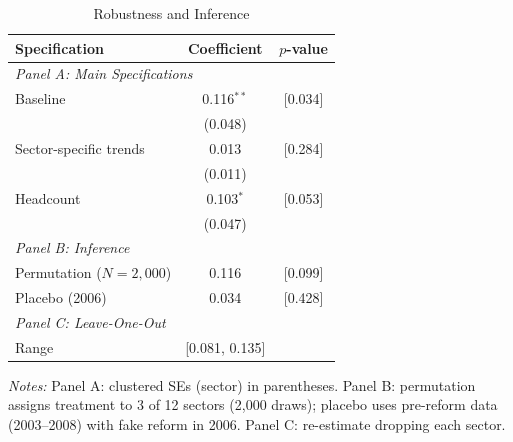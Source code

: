 \begin{table}[htbp]
\centering
\caption{Robustness and Inference}
\label{tab:robustness}
\begin{threeparttable}
\begin{tabular}{lcc}
\toprule
Specification & Coefficient & $p$-value \\
\midrule
\multicolumn{3}{l}{\textit{Panel A: Main Specifications}} \\
Baseline & 0.116$^{**}$ & [0.034] \\
 & (0.048) & \\
Sector-specific trends & 0.013 & [0.284] \\
 & (0.011) & \\
Headcount & 0.103$^{*}$ & [0.053] \\
 & (0.047) & \\
\midrule
\multicolumn{3}{l}{\textit{Panel B: Inference}} \\
Permutation ($N=2{,}000$) & 0.116 & [0.099] \\
Placebo (2006) & 0.034 & [0.428] \\
\midrule
\multicolumn{3}{l}{\textit{Panel C: Leave-One-Out}} \\
Range & [0.081, 0.135] & \\
\bottomrule
\end{tabular}
\begin{tablenotes}[flushleft]\small
\item \textit{Notes:} Panel A: clustered SEs (sector) in parentheses. Panel B: permutation assigns treatment to 3 of 12 sectors (2,000 draws); placebo uses pre-reform data (2003--2008) with fake reform in 2006. Panel C: re-estimate dropping each sector.
\end{tablenotes}
\end{threeparttable}
\end{table}
